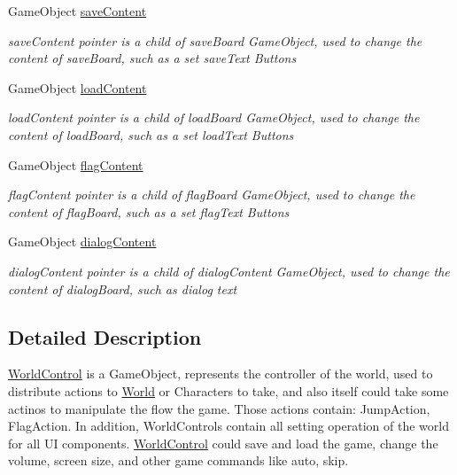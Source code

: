\begin{DoxyCompactItemize}
Game\+Object \hyperlink{class_world_control_a09d1ec3cec5f522a00f22650133b9e7b}{save\+Content}
\begin{DoxyCompactList}\small\item\em save\+Content pointer is a child of save\+Board Game\+Object, used to change the content of save\+Board, such as a set save\+Text Buttons \end{DoxyCompactList}\item 
Game\+Object \hyperlink{class_world_control_a9cb91fce6b5204e9e5fa122c5bc9e242}{load\+Content}
\begin{DoxyCompactList}\small\item\em load\+Content pointer is a child of load\+Board Game\+Object, used to change the content of load\+Board, such as a set load\+Text Buttons \end{DoxyCompactList}\item 
Game\+Object \hyperlink{class_world_control_a1da3147270eacb9ab3bda530708a8790}{flag\+Content}
\begin{DoxyCompactList}\small\item\em flag\+Content pointer is a child of flag\+Board Game\+Object, used to change the content of flag\+Board, such as a set flag\+Text Buttons \end{DoxyCompactList}\item 
Game\+Object \hyperlink{class_world_control_af567a39e5e1822cec6de7fd1cd7f55ea}{dialog\+Content}
\begin{DoxyCompactList}\small\item\em dialog\+Content pointer is a child of dialog\+Content Game\+Object, used to change the content of dialog\+Board, such as dialog text \end{DoxyCompactList}\end{DoxyCompactItemize}


\subsection{Detailed Description}
\hyperlink{class_world_control}{World\+Control} is a Game\+Object, represents the controller of the world, used to distribute actions to \hyperlink{class_world}{World} or Characters to take, and also itself could take some actinos to manipulate the flow the game. Those actions contain\+: Jump\+Action, Flag\+Action. In addition, World\+Controls contain all setting operation of the world for all UI components. \hyperlink{class_world_control}{World\+Control} could save and load the game, change the volume, screen size, and other game commands like auto, skip. 



